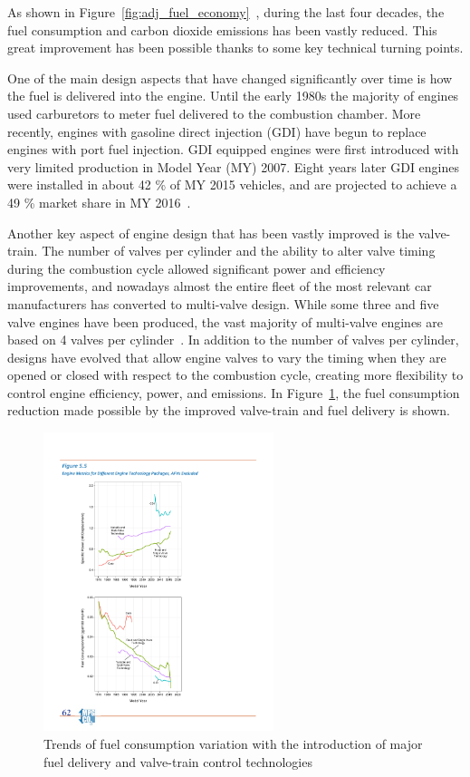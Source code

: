 As shown in Figure~\ref{fig:adj_fuel_economy}~\cite{EPA2016}, during the last four decades, the fuel consumption and carbon dioxide emissions has been vastly reduced. This great improvement has been possible thanks to some key technical turning points.

One of the main design aspects that have changed significantly over time is how the fuel is delivered into the engine. Until the early 1980s the majority of engines used carburetors to meter fuel delivered to the combustion chamber. More recently, engines with gasoline direct injection (GDI) have begun to replace engines with port fuel injection. GDI equipped engines were first introduced with very limited production in Model Year (MY) 2007. Eight years later GDI engines were installed in about 42 \% of MY 2015 vehicles, and are projected to achieve a 49 \% market share in MY 2016~\cite{EPA2016}.

Another key aspect of engine design that has been vastly improved is the valve-train. The number of valves per cylinder and the ability to alter valve timing during the combustion cycle allowed significant power and efficiency improvements, and nowadays almost the entire fleet of the most relevant car manufacturers has converted to multi-valve design. While some three and five valve engines have been produced, the vast majority of multi-valve engines are based on 4 valves per cylinder~\cite{EPA2016}. In addition to the number of valves per cylinder, designs have evolved that allow engine valves to vary the timing when they are opened or closed with respect to the combustion cycle, creating more flexibility to control engine efficiency, power, and emissions. In Figure~\ref{fig:improvement_valve_fuel_delivery}, the fuel consumption reduction made possible by the improved valve-train and fuel delivery is shown. 

\begin{figure}[ht]
  \centering
  \includegraphics[width=0.6\textwidth]{figures/review/improvement_valve_fuel_delivery.pdf}
  \caption{Trends of fuel consumption variation with the introduction of major fuel delivery and valve-train control technologies \label{fig:improvement_valve_fuel_delivery} }
\end{figure}

